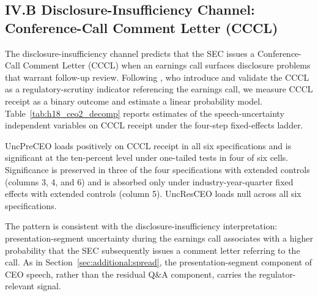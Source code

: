 \subsection*{IV.B Disclosure-Insufficiency Channel: Conference-Call Comment Letter (CCCL)}
\label{sec:additional:cccl}

The disclosure-insufficiency channel predicts that the SEC issues a Conference-Call Comment Letter (CCCL) when an earnings call surfaces disclosure problems that warrant follow-up review. Following , who introduce and validate the CCCL as a regulatory-scrutiny indicator referencing the earnings call, we measure CCCL receipt as a binary outcome and estimate a linear probability model. Table~\ref{tab:h18_ceo2_decomp} reports estimates of the speech-uncertainty independent variables on CCCL receipt under the four-step fixed-effects ladder.

UncPreCEO loads positively on CCCL receipt in all six specifications and is significant at the ten-percent level under one-tailed tests in four of six cells. Significance is preserved in three of the four specifications with extended controls (columns 3, 4, and 6) and is absorbed only under industry-year-quarter fixed effects with extended controls (column 5). UncResCEO loads null across all six specifications.

The pattern is consistent with the disclosure-insufficiency interpretation: presentation-segment uncertainty during the earnings call associates with a higher probability that the SEC subsequently issues a comment letter referring to the call. As in Section~\ref{sec:additional:spread}, the presentation-segment component of CEO speech, rather than the residual Q\&A component, carries the regulator-relevant signal.
